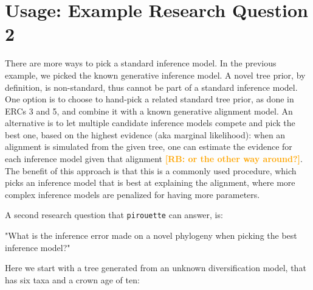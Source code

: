 \documentclass{article}
\newcommand{\richel}[1]{\textcolor{orange}{\textbf{[RB: #1]}}}
\begin{document}
\section{Usage: Example Research Question 2}

There are more ways to pick a standard inference model. In the
previous example, we picked the known generative inference model.
A novel tree prior, by definition, is non-standard, thus cannot be
part of a standard inference model. 
One option is to choose to hand-pick a related 
standard tree prior, as done in ERCs 3 and 5, and combine it with 
a known generative alignment model.
An alternative is to let multiple candidate inference models compete 
and pick the best one, based on the highest evidence (aka marginal likelihood):
when an alignment is simulated from the given tree, one can estimate the
evidence for each inference model given that 
alignment \richel{or the other way around?}.
The benefit of this approach is that this is a commonly used procedure,
which picks an inference model that is
best at explaining the alignment, where more complex inference models are
penalized for having more parameters. 

A second research question that \verb;pirouette; can answer, is:

"What is the inference error made on a novel phylogeny when
picking the best inference model?"

Here we start with a tree generated from an unknown 
diversification model, that has six taxa and a crown age of ten:
\end{document}
